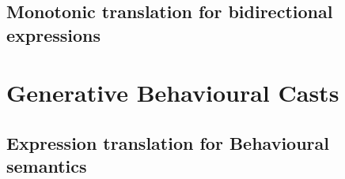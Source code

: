 \documentclass[a4paper,USenglish]{tex/lipics-v2016}
\begin{document}
\subsection{Monotonic translation for bidirectional expressions}



\begin{mathpar}

\end{mathpar}

\section{Generative Behavioural Casts}

\subsection{Expression translation for Behavioural semantics}\label{behtrans}

\end{document}
